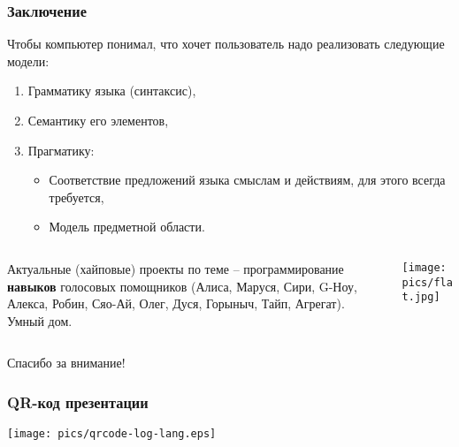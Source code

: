 \documentclass[10pt]{beamer}
\begin{document}
\begin{frame}
  \frametitle{Заключение}
  Чтобы компьютер понимал, что хочет пользователь надо реализовать следующие модели:
  \begin{enumerate}
  \item Грамматику языка (синтаксис),
  \item Семантику его элементов,
  \item Прагматику:
    \begin{itemize}
    \item Соответствие предложений языка смыслам и действиям, для этого всегда требуется,
    \item Модель предметной области.
    \end{itemize}
  \end{enumerate}
  \begin{columns}
    \begin{column}{0.5\linewidth}
      Актуальные (хайповые) проекты по теме -- программирование \textbf{навыков} голосовых помощников (Алиса, Маруся, Сири, G-Ноу, Алекса, Робин, Сяо-Ай, Олег, Дуся, Горыныч, Тайп, Агрегат).\\[1em]
      Умный дом.
    \end{column}
    \begin{column}{0.6\linewidth}
      \texttt{[image: pics/flat.jpg]}
    \end{column}
  \end{columns}
\end{frame}

\begin{frame}
  \vfill
  \begin{center}
    {\Huge Спасибо за внимание!}
  \end{center}
  \vfill
\end{frame}
\begin{frame}
  \frametitle{QR-код презентации}
  \centering
  \texttt{[image: pics/qrcode-log-lang.eps]}
\end{frame}
\end{document}
